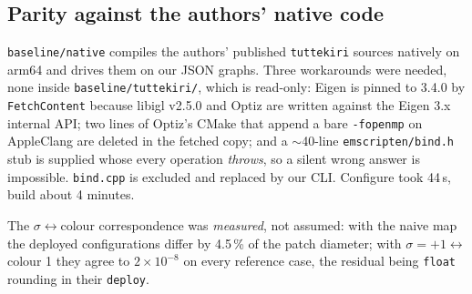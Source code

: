 \documentclass[10pt,a4paper]{article}
\newcommand{\fn}[1]{\nolinkurl{#1}}
\begin{document}
\subsection{Parity against the authors' native code}

\fn{baseline/native} compiles the authors' published \fn{tuttekiri} sources natively on arm64
and drives them on our JSON graphs. Three workarounds were needed, none inside
\fn{baseline/tuttekiri/}, which is read-only: Eigen is pinned to 3.4.0 by \texttt{FetchContent}
because libigl v2.5.0 and Optiz are written against the Eigen 3.x internal API; two lines of
Optiz's CMake that append a bare \texttt{-fopenmp} on AppleClang are deleted in the fetched
copy; and a $\sim$40-line \fn{emscripten/bind.h} stub is supplied whose every operation
\emph{throws}, so a silent wrong answer is impossible. \fn{bind.cpp} is excluded and replaced
by our CLI. Configure took 44\,s, build about 4 minutes.

The $\sigma\leftrightarrow$colour correspondence was \emph{measured}, not assumed: with the
naive map the deployed configurations differ by 4.5\,\% of the patch diameter; with
$\sigma=+1 \leftrightarrow$ colour 1 they agree to $2\times10^{-8}$ on every reference case,
the residual being \texttt{float} rounding in their \texttt{deploy}.
\end{document}
